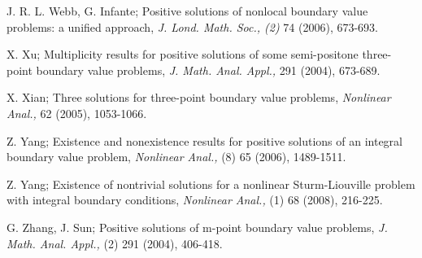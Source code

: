 \documentclass[reqno]{amsart}\usepackage{amsmath}
\begin{document}
\begin{thebibliography}{9}
 J. R. L. Webb, G. Infante; Positive solutions of nonlocal boundary value
problems: a unified approach, \emph{J. Lond. Math. Soc., (2)} 74 (2006), 673-693.










 X. Xu; Multiplicity results for positive solutions of some
semi-positone three-point boundary value problems, \emph{J. Math. Anal.
Appl.,} 291 (2004), 673-689.


 X. Xian; Three solutions for three-point boundary value
problems, \emph{Nonlinear Anal.,} 62 (2005), 1053-1066.






 Z. Yang; Existence and nonexistence results for positive solutions of an
integral boundary value problem, \emph{Nonlinear Anal.,} (8) 65 (2006), 1489-1511.

 Z. Yang; Existence of nontrivial solutions for a nonlinear Sturm-Liouville
problem with integral boundary conditions, \emph{Nonlinear Anal.,} (1) 68 (2008), 216-225.

 G. Zhang, J. Sun; Positive solutions of m-point boundary value problems,
\emph{J. Math. Anal. Appl.,} (2) 291 (2004), 406-418.








\end{thebibliography} 
\end{document}

